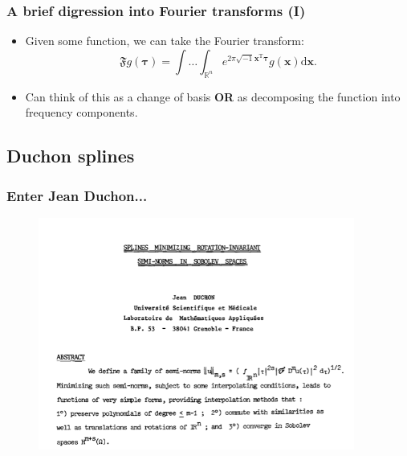\documentclass[ignorenonframetext]{beamer} %
\newcommand{\bi}{\begin{itemize}}
\newcommand{\ei}{\end{itemize}}
\begin{document}
\begin{frame}
	\frametitle{A brief digression into Fourier transforms (I)} 
	\bi
		\item Given some function, we can take the Fourier transform:
		\begin{equation*}
			\mathfrak{F} g(\boldsymbol{\tau}) = \int \ldots \int_{\mathbb{R}^n} e^{2 \pi \sqrt{-1} \mathbf{x}^\text{T} \boldsymbol{\tau}} g(\mathbf{x}) \text{d}\mathbf{x}.
		\end{equation*}
		\item Can think of this as a change of basis \textbf{OR} as decomposing the function into frequency components.	
	\ei
\end{frame}






\subsection{Duchon splines}

\begin{frame}
	\frametitle{Enter Jean Duchon...} 
	\begin{figure}
		\includegraphics[height=3in]{figs/Duchon-paper.png}
	\end{figure}

\end{frame}
\end{document}
